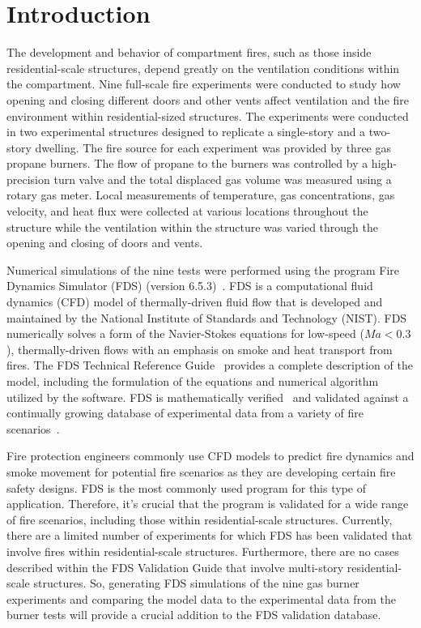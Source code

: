 
\renewcommand{\thechapter}{1}

\chapter{Introduction}
The development and behavior of compartment fires, such as those inside residential-scale structures, depend greatly on the ventilation conditions within the compartment. Nine full-scale fire experiments were conducted to study how opening and closing different doors and other vents affect ventilation and the fire environment within residential-sized structures. The experiments were conducted in two experimental structures designed to replicate a single-story and a two-story dwelling. The fire source for each experiment was provided by three gas propane burners. The flow of propane to the burners was controlled by a high-precision turn valve and the total displaced gas volume was measured using a rotary gas meter. Local measurements of temperature, gas concentrations, gas velocity, and heat flux were collected at various locations throughout the structure while the ventilation within the structure was varied through the opening and closing of doors and vents. 


Numerical simulations of the nine tests were performed using the program Fire Dynamics Simulator (FDS) (version 6.5.3)~\cite{FDS_Users_Guide}. FDS is a computational fluid dynamics (CFD) model of thermally-driven fluid flow that is developed and maintained by the National Institute of Standards and Technology (NIST). FDS numerically solves a form of the Navier-Stokes equations for low-speed ($Ma < 0.3$), thermally-driven flows with an emphasis on smoke and heat transport from fires. The FDS Technical Reference Guide~\cite{FDS_Tech_Guide} provides a complete description of the model, including the formulation of the equations and numerical algorithm utilized by the software. FDS is mathematically verified~\cite{FDS_Verification_Guide} and validated against a continually growing database of experimental data from a variety of fire scenarios~\cite{FDS_Validation_Guide}.

Fire protection engineers commonly use CFD models to predict fire dynamics and smoke movement for potential fire scenarios as they are developing certain fire safety designs. FDS is the most commonly used program for this type of application. Therefore, it's crucial that the program is validated for a wide range of fire scenarios, including those within residential-scale structures. Currently, there are a limited number of experiments for which FDS has been validated that involve fires within residential-scale structures. Furthermore, there are no cases described within the FDS Validation Guide that involve multi-story residential-scale structures. So, generating FDS simulations of the nine gas burner experiments and comparing the model data to the experimental data from the burner tests will provide a crucial addition to the FDS validation database.

